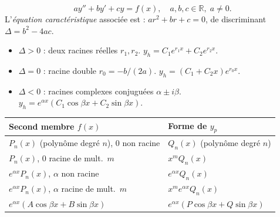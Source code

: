 \documentclass[11pt,a4paper,twoside]{book}
\newcommand{\R}{\mathbb{R}}
\begin{document}
\begin{definitionbox}
\[
  ay'' + by' + cy = f(x), \quad a,b,c \in \R,\; a \neq 0.
\]
L'\emph{équation caractéristique} associée est : $ar^2 + br + c = 0$, de discriminant $\Delta = b^2 - 4ac$.
\end{definitionbox}

\begin{theoremebox}[Solutions de l'homogène $ay''+by'+cy=0$]
\begin{itemize}
  \item $\Delta > 0$ : deux racines réelles $r_1, r_2$. $y_h = C_1 e^{r_1 x} + C_2 e^{r_2 x}$.
  \item $\Delta = 0$ : racine double $r_0 = -b/(2a)$. $y_h = (C_1 + C_2 x)e^{r_0 x}$.
  \item $\Delta < 0$ : racines complexes conjuguées $\alpha \pm i\beta$. $y_h = e^{\alpha x}(C_1\cos\beta x + C_2\sin\beta x)$.
\end{itemize}
\end{theoremebox}

\begin{methodebox}
\begin{center}
\begin{tabular}{ll}
\toprule
Second membre $f(x)$ & Forme de $y_p$ \\
\midrule
$P_n(x)$ (polynôme degré $n$), $0$ non racine & $Q_n(x)$ (polynôme degré $n$) \\
$P_n(x)$, $0$ racine de mult.\ $m$ & $x^m Q_n(x)$ \\
$e^{\alpha x}P_n(x)$, $\alpha$ non racine & $e^{\alpha x}Q_n(x)$ \\
$e^{\alpha x}P_n(x)$, $\alpha$ racine de mult.\ $m$ & $x^m e^{\alpha x}Q_n(x)$ \\
$e^{\alpha x}(A\cos\beta x + B\sin\beta x)$ & $e^{\alpha x}(P\cos\beta x + Q\sin\beta x)$ \\
\bottomrule
\end{tabular}
\end{center}
\end{methodebox}
\end{document}
